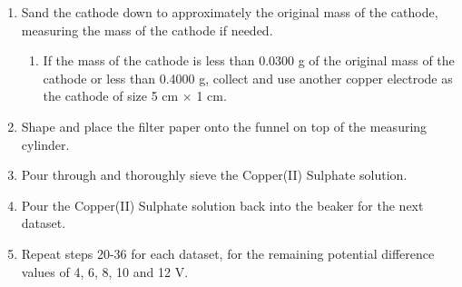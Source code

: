 \documentclass[11pt, a4]{article}
\begin{document}
\begin{enumerate}
				\item Sand the cathode down to approximately the original mass of the cathode, measuring the mass of the cathode if needed.
				\begin{enumerate}
					\item If the mass of the cathode is less than 0.0300 g of the original mass of the cathode or less than 0.4000 g, collect and use another copper electrode as the cathode of size 5 cm $\times$ 1 cm.
				\end{enumerate}
				\item Shape and place the filter paper onto the funnel on top of the measuring cylinder.
				\item Pour through and thoroughly sieve the Copper(II) Sulphate solution.
				\item Pour the Copper(II) Sulphate solution back into the beaker for the next dataset.
				\item Repeat steps 20-36 for each dataset, for the remaining potential difference values of 4, 6, 8, 10 and 12 V.
			\end{enumerate}
\end{document}
